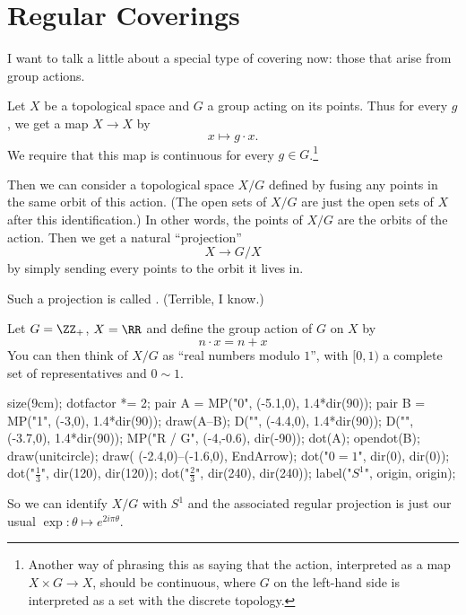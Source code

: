 \section{Regular Coverings}
I want to talk a little about a special type of covering now: those
that arise from group actions.

Let $X$ be a topological space and $G$ a group acting on its points.
Thus for every $g$, we get a map $X \to X$ by 
\[ x \mapsto g \cdot x. \]
We require that this map is continuous for every $g \in G$.\footnote{%
	Another way of phrasing this as saying that the action,
	interpreted as a map $X \times G \to X$, should be continuous,
	where $G$ on the left-hand side is interpreted as a set with
	the discrete topology.}

Then we can consider a topological space $X/G$ defined by fusing any points
in the same orbit of this action.
(The open sets of $X/G$ are just the open sets of $X$ after this identification.)
In other words, the points of $X/G$ are the orbits of the action.
Then we get a natural ``projection''
\[ X \to G/X \]
by simply sending every points to the orbit it lives in.
\begin{definition}
	Such a projection is called .
	(Terrible, I know.)
\end{definition}

\begin{example}[$\RR \to S^1$ is regular]
	Let $G = \ZZ_+$, $X = \RR$
	and define the group action of $G$ on $X$ by 
	\[ n \cdot x = n + x \]
	You can then think of $X/G$ as ``real numbers modulo $1$'',
	with $[0,1)$ a complete set of representatives and $0 \sim 1$.
	\begin{center}
		\begin{asy}
			size(9cm);
			dotfactor *= 2;
			pair A = MP("0", (-5.1,0), 1.4*dir(90));
			pair B = MP("1", (-3,0), 1.4*dir(90));
			draw(A--B);
			D("", (-4.4,0), 1.4*dir(90));
			D("", (-3.7,0), 1.4*dir(90));
			MP("\mathbb R / G", (-4,-0.6), dir(-90));
			dot(A); opendot(B);
			draw(unitcircle);
			draw( (-2.4,0)--(-1.6,0), EndArrow);
			dot("$0=1$", dir(0), dir(0));
			dot("$\frac13$", dir(120), dir(120));
			dot("$\frac23$", dir(240), dir(240));
			label("$S^1$", origin, origin);
		\end{asy}
	\end{center}
	So we can identify $X/G$ with $S^1$
	and the associated regular projection
	is just our usual $\exp : \theta \mapsto e^{2i\pi \theta}$.
\end{example}
	
